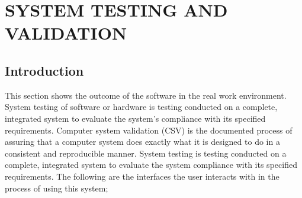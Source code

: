 \documentclass[11pt]{article}
\begin{document}
\section{SYSTEM TESTING AND VALIDATION}
\subsection{Introduction}
This section shows the outcome of the software in the real work environment.
System testing of software or hardware is testing conducted on a complete, integrated system to evaluate the system's compliance with its specified requirements.
Computer system validation (CSV) is the documented process of assuring that a computer system does exactly what it is designed to do in a consistent and reproducible manner.
System testing is testing conducted on a complete, integrated system to evaluate the system compliance with its specified requirements. The following are the interfaces the user interacts with in the process of using this system; \cite{polson1992cognitive}





\end{document}
